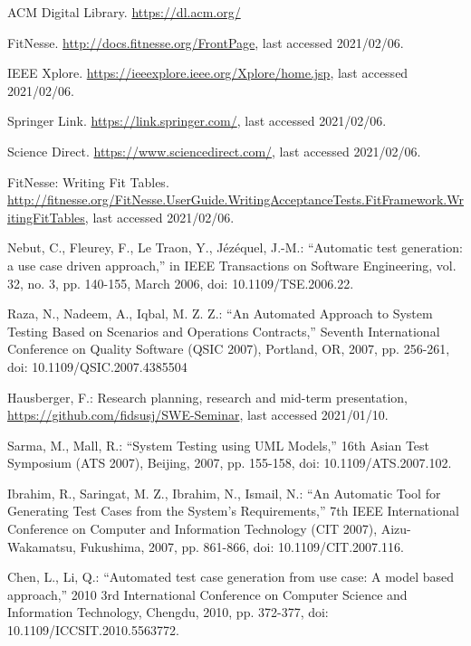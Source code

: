 \documentclass[a4paper,10pt, bibliography=totocnumbered]{scrreprt}
\begin{document}
\begin{thebibliography}{9}
 ACM Digital Library. \url{https://dl.acm.org/} 

 FitNesse. \url{http://docs.fitnesse.org/FrontPage}, last accessed 2021/02/06.

 IEEE Xplore. \url{https://ieeexplore.ieee.org/Xplore/home.jsp}, last accessed 2021/02/06.

 Springer Link. \url{https://link.springer.com/}, last accessed 2021/02/06.

 Science Direct. \url{https://www.sciencedirect.com/}, last accessed 2021/02/06.

 FitNesse: Writing Fit Tables. \url{http://fitnesse.org/FitNesse.UserGuide.WritingAcceptanceTests.FitFramework.WritingFitTables}, last accessed 2021/02/06.


 Nebut, C., Fleurey, F., Le Traon, Y., Jézéquel, J.-M.: \enquote{Automatic test generation: a use case driven approach,} in IEEE Transactions on Software Engineering, vol. 32, no. 3, pp. 140-155, March 2006, doi: 10.1109/TSE.2006.22.

 Raza, N., Nadeem, A., Iqbal, M. Z. Z.: \enquote{An Automated Approach to System Testing Based on Scenarios and Operations Contracts,} Seventh International Conference on Quality Software (QSIC 2007), Portland, OR, 2007, pp. 256-261, doi: 10.1109/QSIC.2007.4385504

 Hausberger, F.: Research planning, research and mid-term presentation, \url{https://github.com/fidsusj/SWE-Seminar}, last accessed 2021/01/10.

 Sarma, M., Mall, R.: \enquote{System Testing using UML Models,} 16th Asian Test Symposium (ATS 2007), Beijing, 2007, pp. 155-158, doi: 10.1109/ATS.2007.102.

 Ibrahim, R., Saringat, M. Z., Ibrahim, N., Ismail, N.: \enquote{An Automatic Tool for Generating Test Cases from the System's Requirements,} 7th IEEE International Conference on Computer and Information Technology (CIT 2007), Aizu-Wakamatsu, Fukushima, 2007, pp. 861-866, doi: 10.1109/CIT.2007.116.


 Chen, L., Li, Q.: \enquote{Automated test case generation from use case: A model based approach,} 2010 3rd International Conference on Computer Science and Information Technology, Chengdu, 2010, pp. 372-377, doi: 10.1109/ICCSIT.2010.5563772.


\end{thebibliography}
\end{document}
